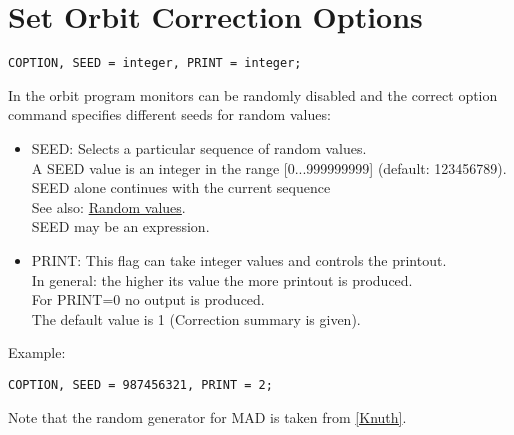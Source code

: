 
\section{Set Orbit Correction Options}  

\begin{verbatim}
COPTION, SEED = integer, PRINT = integer;      
\end{verbatim}

In the orbit program monitors can be randomly disabled and the correct
option command specifies different seeds for random values:  

\begin{itemize}
   \item SEED: Selects a particular sequence of random values. 
     \\ A SEED value is an integer in the range [0...999999999] (default: 123456789). 
     \\ SEED alone continues with the current sequence 
     \\ See also: \href{../Introduction/expression.html#random}{Random values}. 
     \\ SEED may be an expression. 
   \item PRINT: This flag can take integer values and controls the printout. 
     \\ In general: the higher its value the more printout is produced.  
     \\ For PRINT=0 no output is produced. 
     \\ The default value is 1 (Correction summary is given). 
\end{itemize}

Example: 
\begin{verbatim}
COPTION, SEED = 987456321, PRINT = 2;
\end{verbatim}

Note that the random generator for MAD is taken from
\href{../Introduction/bibliography.html#knuth}{[Knuth]}.  

